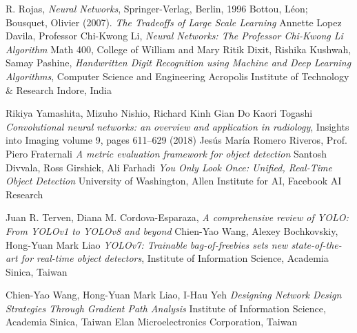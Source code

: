 \documentclass[12pt,a4paper,openright,twoside]{report}
\begin{document}
\newpage
\begin{thebibliography}{}             %
\rhead[\fancyplain{}{\bfseries \leftmark}]{\fancyplain{}{\bfseries
\thepage}}


 R. Rojas, \emph{Neural Networks}, Springer-Verlag, Berlin, 1996
 Bottou, Léon; Bousquet, Olivier (2007). \emph{The Tradeoffs of Large Scale Learning}
 Annette Lopez Davila, Professor Chi-Kwong Li, \emph{Neural Networks: The Professor Chi-Kwong Li Algorithm} Math 400, College of William and Mary
 Ritik Dixit, Rishika Kushwah, Samay Pashine, \emph{Handwritten Digit Recognition using Machine and Deep Learning Algorithms}, Computer Science and Engineering
Acropolis Institute of Technology \& Research
Indore, India

Rikiya Yamashita, Mizuho Nishio, Richard Kinh Gian Do Kaori Togashi \emph{Convolutional neural networks: an overview
and application in radiology}, Insights into Imaging volume 9, pages 611–629 (2018)
 Jesús María Romero Riveros, Prof. Piero Fraternali \emph{A metric evaluation framework for object detection}
  Santosh Divvala, Ross Girshick, Ali Farhadi \emph{You Only Look Once: Unified, Real-Time Object Detection} University of Washington, Allen Institute for AI, Facebook AI Research

 Juan R. Terven, Diana M. Cordova-Esparaza, \emph{A comprehensive review of YOLO: From YOLOv1 to YOLOv8 and beyond}
Chien-Yao Wang, Alexey Bochkovskiy, Hong-Yuan Mark Liao \emph{YOLOv7: Trainable bag-of-freebies sets new state-of-the-art for real-time object
detectors}, Institute of Information Science, Academia Sinica, Taiwan

Chien-Yao Wang, Hong-Yuan Mark Liao, I-Hau Yeh \emph{Designing Network Design Strategies Through Gradient Path Analysis}
Institute of Information Science, Academia Sinica, Taiwan Elan Microelectronics Corporation, Taiwan


\end{thebibliography}
\end{document}
